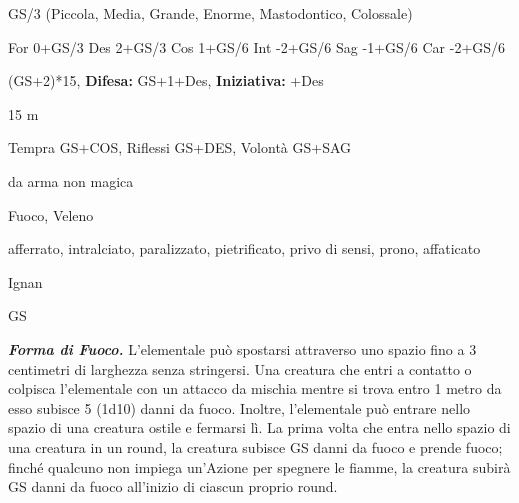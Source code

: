 \begin{multicols}{2}
{
\begin{description}[noitemsep, topsep=0pt, parsep=0pt, partopsep=0pt, itemsep=1pt, leftmargin=2.35cm,  labelwidth=2.2cm, itemindent=0cm, listparindent=0pt] %
\setlength{\baselineskip}{10pt}
\item[\textbf{Taglia/Tipo}] GS/3 (Piccola, Media, Grande, Enorme, Mastodontico, Colossale)
\item[\textbf{Caratt.}] For 0+GS/3 Des 2+GS/3 Cos 1+GS/6 Int -2+GS/6 Sag -1+GS/6 Car -2+GS/6
\item[\textbf{Punti Ferita}] (GS+2)*15, \textbf{Difesa:} GS+1+Des, \textbf{Iniziativa:} +Des
\item[\textbf{Movimento}] 15 m
\item[\textbf{Tiri Salvez.}] Tempra GS+COS, Riflessi GS+DES, Volontà GS+SAG
\item[\textbf{Res. Danni}] da arma non magica
\item[\textbf{Imm. Danni}] Fuoco, Veleno
\item[\textbf{Immunità}] afferrato, intralciato, paralizzato, pietrificato, privo di sensi, prono, affaticato
\item[\textbf{Sensi}] 
\item[\textbf{Linguaggi}] Ignan
\item[\textbf{Sfida}] GS \\
\end{description}

\emph{\textbf{Forma di Fuoco.}} L'elementale può spostarsi attraverso uno spazio fino a 3 centimetri di larghezza senza stringersi. Una creatura che entri a contatto o colpisca l'elementale con un attacco da mischia mentre si trova entro 1 metro da esso subisce 5 (1d10) danni da fuoco. Inoltre, l'elementale può entrare nello spazio di una creatura ostile e fermarsi lì. La prima volta che entra nello spazio di una creatura in un round, la creatura subisce GS danni da fuoco e prende fuoco; finché qualcuno non impiega un'Azione per spegnere le fiamme, la creatura subirà GS danni da fuoco all'inizio di ciascun proprio round.\\

}
\end{multicols}
